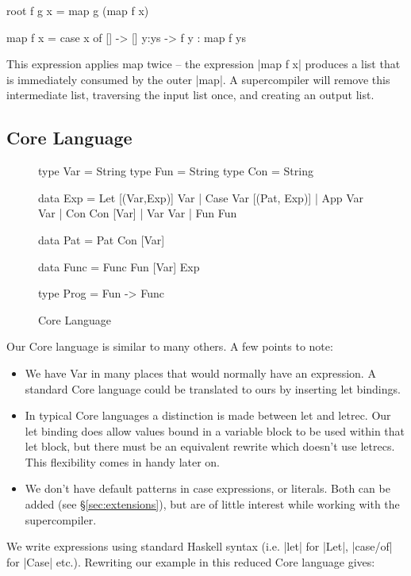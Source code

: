 \documentclass{sigplanconf}
\begin{document}
\begin{code}
root f g x = map g (map f x)

map f x = case x of
    [] -> []
    y:ys -> f y : map f ys
\end{code}

This expression applies map twice -- the expression |map f x| produces a list that is immediately consumed by the outer |map|. A supercompiler will remove this intermediate list, traversing the input list once, and creating an output list.

\subsection{Core Language}
\label{sec:core}

\begin{figure}
\begin{code}
type Var = String
type Fun = String
type Con = String

data Exp = Let [(Var,Exp)] Var
         | Case Var [(Pat, Exp)]
         | App Var Var
         | Con Con [Var]
         | Var Var
         | Fun Fun

data Pat = Pat Con [Var]

data Func = Func Fun [Var] Exp

type Prog = Fun -> Func
\end{code}
\caption{Core Language}
\label{fig:core}
\end{figure}

Our Core language is similar to many others. A few points to note:

\begin{itemize}
\item We have Var in many places that would normally have an expression. A standard Core language could be translated to ours by inserting let bindings.
\item In typical Core languages a distinction is made between let and letrec. Our let binding does allow values bound in a variable block to be used within that let block, but there must be an equivalent rewrite which doesn't use letrecs. This flexibility comes in handy later on.
\item We don't have default patterns in case expressions, or literals. Both can be added (see \S\ref{sec:extensions}), but are of little interest while working with the supercompiler.
\end{itemize}

We write expressions using standard Haskell syntax (i.e. |let| for |Let|, |case/of| for |Case| etc.). Rewriting our example in this reduced Core language gives:
\end{document}
